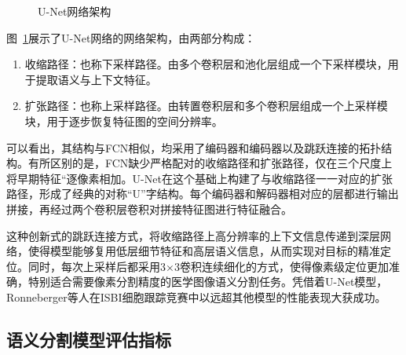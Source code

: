 \begin{figure}[htbp]
    \centering
    \caption{U-Net网络架构}
    \label{fig:unet_frame}
\end{figure}

图~\ref{fig:unet_frame}展示了U-Net网络的网络架构，由两部分构成：

\begin{enumerate}
    \item 收缩路径：也称下采样路径。由多个卷积层和池化层组成一个下采样模块，用于提取语义与上下文特征。
    \item 扩张路径：也称上采样路径。由转置卷积层和多个卷积层组成一个上采样模块，用于逐步恢复特征图的空间分辨率。
\end{enumerate}

可以看出，其结构与FCN相似，均采用了编码器和编码器以及跳跃连接的拓扑结构。有所区别的是，FCN缺少严格配对的收缩路径和扩张路径，仅在三个尺度上将早期特征“逐像素相加。U-Net在这个基础上构建了与收缩路径一一对应的扩张路径，形成了经典的对称“U”字结构。每个编码器和解码器相对应的层都进行输出拼接，再经过两个卷积层卷积对拼接特征图进行特征融合。

这种创新式的跳跃连接方式，将收缩路径上高分辨率的上下文信息传递到深层网络，使得模型能够复用低层细节特征和高层语义信息，从而实现对目标的精准定位。同时，每次上采样后都采用3×3卷积连续细化的方式，使得像素级定位更加准确，特别适合需要像素分割精度的医学图像语义分割任务。凭借着U-Net模型，Ronneberger等人在ISBI细胞跟踪竞赛中以远超其他模型的性能表现大获成功\cite{ronneberger2015}。

\subsection{语义分割模型评估指标}


